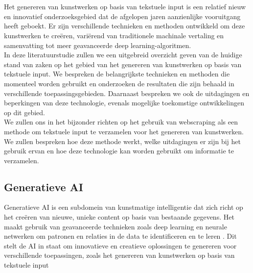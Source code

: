 \chapter{}%
\label{ch:stand-van-zaken}


Het genereren van kunstwerken op basis van tekstuele input is een relatief nieuw en innovatief onderzoeksgebied dat de afgelopen jaren aanzienlijke vooruitgang heeft geboekt. Er zijn verschillende technieken en methoden ontwikkeld om deze kunstwerken te creëren, variërend van traditionele machinale vertaling en samenvatting tot meer geavanceerde deep learning-algoritmen.\\

In deze literatuurstudie zullen we een uitgebreid overzicht geven van de huidige stand van zaken op het gebied van het genereren van kunstwerken op basis van tekstuele input. We bespreken de belangrijkste technieken en methoden die momenteel worden gebruikt en onderzoeken de resultaten die zijn behaald in verschillende toepassingsgebieden. Daarnaast bespreken we ook de uitdagingen en beperkingen van deze technologie, evenals mogelijke toekomstige ontwikkelingen op dit gebied.\\

We zullen ons in het bijzonder richten op het gebruik van webscraping als een methode om tekstuele input te verzamelen voor het genereren van kunstwerken. We zullen bespreken hoe deze methode werkt, welke uitdagingen er zijn bij het gebruik ervan en hoe deze technologie kan worden gebruikt om informatie te verzamelen.
\pagebreak


\section{Generatieve AI}

Generatieve AI is een subdomein van kunstmatige intelligentie dat zich richt op het creëren van nieuwe, unieke content op basis van bestaande gegevens. Het maakt gebruik van geavanceerde technieken zoals deep learning en neurale netwerken om patronen en relaties in de data te identificeren en te leren . Dit stelt de AI in staat om innovatieve en creatieve oplossingen te genereren voor verschillende toepassingen, zoals het genereren van kunstwerken op basis van tekstuele input \autocite{SonixAI2021}\\

